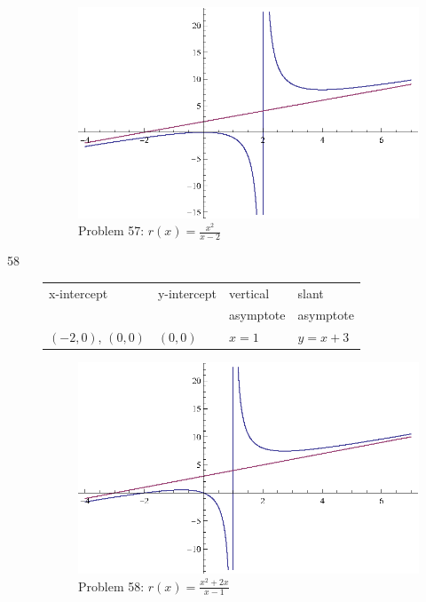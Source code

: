 \documentclass{exam}
\begin{document}
\begin{description}
      \begin{figure}[H]
        \centering
        \includegraphics[scale = 0.8]{problem57.eps}
        \caption*{ Problem 57: $r(x) = \frac{x^2}{x - 2}$ }
      \end{figure}

    \item[58]
      \begin{tabular}{llll}
        \toprule
        x-intercept         & y-intercept & vertical  & slant \\
                            &             & asymptote & asymptote \\
        \midrule
        $(-2, 0)$, $(0, 0)$ & $(0, 0)$    & $x = 1$   & $y = x + 3$ \\
        \bottomrule
      \end{tabular}

      \begin{figure}[H]
        \centering
        \includegraphics[scale = 0.8]{problem58.eps}
        \caption*{ Problem 58: $r(x) = \frac{x^2 + 2x}{x - 1}$ }
      \end{figure}


\end{description}
\end{document}
